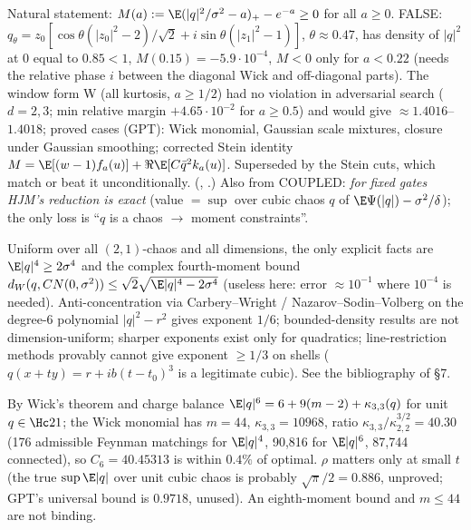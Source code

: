 \begin{negative}
Natural statement: $M(a):=\E(|q|^2/\sigma^2-a)_+-e^{-a}\ge0$ for all $a\ge0$. FALSE: $q_\theta=z_0[\cos\theta(|z_0|^2-2)/\sqrt2+i\sin\theta(|z_1|^2-1)]$, $\theta\approx0.47$,
has density of $|q|^2$ at $0$ equal to $0.85<1$, $M(0.15)=-5.9\cdot10^{-4}$, $M<0$ only for $a<0.22$ (needs the relative phase $i$ between the diagonal Wick and
off-diagonal parts). The window form W (all kurtosis, $a\ge1/2$) had no violation in adversarial search ($d=2,3$; min relative margin $+4.65\cdot10^{-2}$ for
$a\ge0.5$) and would give $\approx1.4016$--$1.4018$; proved cases (GPT): Wick monomial, Gaussian scale mixtures, closure under Gaussian smoothing;
corrected Stein identity $M=\E[(w-1)f_a(u)]+\Re\E[C\bar q^2k_a(u)]$. Superseded by the Stein cuts, which match or beat it unconditionally.
(, .) Also from COUPLED: \emph{for fixed gates HJM's reduction is exact}
(value $=\sup$ over cubic chaos $q$ of $\E\Psi(|q|)-\sigma^2/\delta$); the only loss is ``$q$ is a chaos $\to$ moment constraints''.
\end{negative}

\begin{negative}
Uniform over all $(2,1)$-chaos and all dimensions, the only explicit facts are $\E|q|^4\ge2\sigma^4$ and the complex fourth-moment bound
$d_W(q,CN(0,\sigma^2))\le\sqrt2\sqrt{\E|q|^4-2\sigma^4}$ \cite{CCL23} (useless here: error $\approx10^{-1}$ where $10^{-4}$ is needed). Anti-concentration
via Carbery--Wright / Nazarov--Sodin--Volberg on the degree-6 polynomial $|q|^2-r^2$ gives exponent $1/6$; bounded-density results are not
dimension-uniform; sharper exponents exist only for quadratics; line-restriction methods provably cannot give exponent $\ge1/3$ on shells
($q(x+ty)=r+ib(t-t_0)^3$ is a legitimate cubic). See the bibliography of  \S7.
\end{negative}

\begin{negative}
By Wick's theorem and charge balance $\E|q|^6=6+9(m-2)+\kappa_{3,3}(q)$ for unit $q\in\Hc21$; the Wick monomial has $m=44$, $\kappa_{3,3}=10968$, ratio
$\kappa_{3,3}/\kappa_{2,2}^{3/2}=40.30$ (176 admissible Feynman matchings for $\E|q|^4$, 90,816 for $\E|q|^6$, 87,744 connected), so $C_6=40.45313$ is within
$0.4\%$ of optimal. $\rho$ matters only at small $t$ (the true $\sup\E|q|$ over unit cubic chaos is probably $\sqrt\pi/2=0.886$, unproved; GPT's universal
bound is $0.9718$, unused). An eighth-moment bound and $m\le44$ are not binding.
\end{negative}

